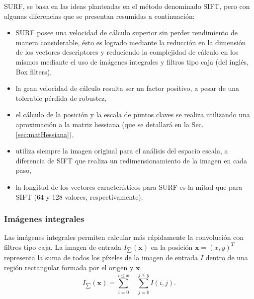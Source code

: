   SURF, se basa en las ideas planteadas en el método denominado SIFT, pero con algunas diferencias que se presentan resumidas a continuación:
        \begin{itemize}
	\item SURF posee una velocidad de cálculo superior sin perder rendimiento de manera considerable, ésto es logrado mediante la reducción en la dimensión de los vectores descriptores y reduciendo la complejidad de cálculo en los mismos mediante el uso de imágenes integrales \cite{Viola01rapidobject} y filtros tipo caja (del inglés, Box filters)\cite{Simard99boxlets:a},
	\item la gran velocidad de cálculo resulta ser un factor positivo, a pesar de una tolerable pérdida de robustez,
	\item el cálculo de la posición y la escala de puntos claves se realiza utilizando una aproximación a la matriz hessiana (que se detallará en la Sec. \ref{sec:matHessiana}), %
	\item utiliza siempre la imagen original para el análisis del espacio escala, a diferencia de SIFT que realiza un redimensionamiento de la imagen en cada paso,
	\item la longitud de los vectores característicos para SURF es la mitad que para SIFT (64 y 128 valores, respectivamente).
       \end{itemize}
  \subsubsection{Imágenes integrales}
      \label{sec:imagenes_integrales}
      Las imágenes integrales \cite{Viola01rapidobject} permiten calcular más rápidamente la convolución con filtros tipo caja. La imagen de entrada $\mathit{I_{\sum}(\mathbf{x})}$ en la posición $\mathbf{x}=(x,y)^{T}$ representa la suma de todos los píxeles de la imagen de entrada $\mathit{I}$ dentro de una región rectangular formada por el origen y $\mathbf{x}$.
      \begin{equation}
      \label{eq:integral_image_1}
      \mathit{I}_{\sum}(\mathbf{x})=\sum_{i=0}^{i\leq x}\quad\sum_{j=0}^{j\leq y}I(i,j).
      \end{equation}

